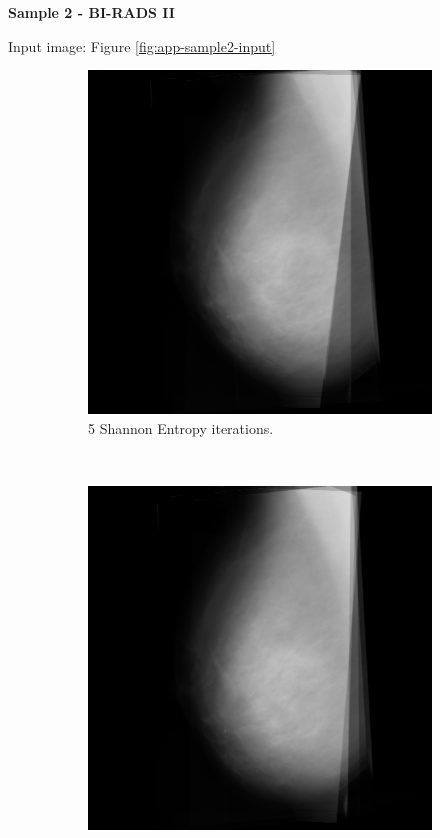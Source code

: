 \newpage \noindent \textbf{Sample 2 - BI-RADS II}

Input image: Figure \ref{fig:app-sample2-input}

\begin{figure}[H]
    \centering
    \begin{subfigure}[t]{0.3\textwidth}
        \includegraphics[width=\textwidth]{Appendix5/sample2/shannon/5_scan.png}
        \caption{5 Shannon Entropy iterations.}
        \label{fig:app-5-shannon-sample2}
    \end{subfigure} \hfill
    ~ %
    \begin{subfigure}[t]{0.3\textwidth}
        \includegraphics[width=\textwidth]{Appendix5/sample2/shannon/10_scan.png}

\end{subfigure}
\end{figure}
